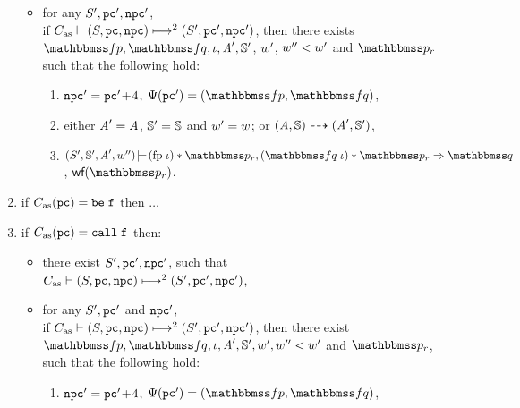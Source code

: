 \begin{definition}
\begin{enumerate}[1.]
\begin{itemize}
                \item for any $\state', \pc', \npc'$, \\ if
                $\multilptrans{\asmimp}{2}{(\state, \pc, \npc)}{(\state', \pc', \npc')}$,
                then there exists $\relspecpre, \relspecpost, \lgvl,
                \primcom', \hpstate'$, $\word'$,
                $\word'' < \word'$ and $\relastP_r$
                such that the following hold:
                \begin{enumerate}[(1)]
                    \item %
                        $\npc' = \pc' \!+\! 4$,
                        $\Cspec (\pc') = (\relspecpre, \relspecpost)$,
                    \item either $\primcom' = \primcom$,
                    $\hpstate' = \hpstate$ and $\word' = \word$;
                    or
                    $\primTrans{(\primcom, \hpstate)}
                        {(\primcom', \hpstate')}$,
                    \item
                        $\asrtmodel{(\state', \hpstate', \primcom', \word'')}
                        {(\specpre \; \lgvl) \sepstar \relastP_r},
                        (\relspecpost \; \lgvl) \sepstar \relastP_r
                        \Rightarrow \relastQ$, $\wfFrm(\relastP_r)$.
                \end{enumerate}
            \end{itemize}

            \item if $\asmimp(\pc) = \be \; \lab{}$ then $\dots$
		
            \item if $\asmimp (\pc) = \call \; \lab{}$ then:
            \begin{itemize}
                \item there exist $\state', \pc', \npc'$, such that
                \\
                $\multilptrans{\asmimp}{2}{(\state, \pc, \npc)}
                    {(\state', \pc', \npc')}$,

                \item for any $\state', \pc'$ and $\npc'$, \\
                if
                $\multilptrans{\asmimp}{2}{(\state, \pc, \npc)}{(\state', \pc', \npc')}$,
                then there exist $\relspecpre, \relspecpost, \lgvl,
                \primcom', \hpstate', \word', \word'' < \word'$
                and $\relastP_r$, such that the following hold:
                \begin{enumerate}[(1)]
                    \item $\npc' = \pc'\!+\!4$,
                        $\Cspec(\pc') = (\relspecpre, \relspecpost)$,


\end{enumerate}
\end{itemize}
\end{enumerate}
\end{definition}
